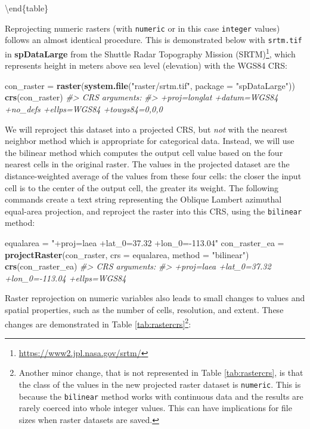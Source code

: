 \documentclass[]{krantz}
\newenvironment{Shaded}{\begin{snugshade}}{\end{snugshade}}
\newcommand{\CommentTok}[1]{\textcolor[rgb]{0.37,0.37,0.37}{\textit{#1}}}
\newcommand{\DataTypeTok}[1]{\textcolor[rgb]{0.27,0.27,0.27}{#1}}
\newcommand{\KeywordTok}[1]{\textcolor[rgb]{0.27,0.27,0.27}{\textbf{#1}}}
\newcommand{\NormalTok}[1]{#1}
\newcommand{\StringTok}[1]{\textcolor[rgb]{0.5,0.5,0.5}{#1}}
\let\rmarkdownfootnote\footnote%
\def\footnote{\protect\rmarkdownfootnote}
\renewcommand{\href}[2]{#2\footnote{\url{#1}}}
\begin{document}
\textbackslash{}end\{table\}

Reprojecting numeric rasters (with \texttt{numeric} or in this case \texttt{integer} values) follows an almost identical procedure.
This is demonstrated below with \texttt{srtm.tif} in \textbf{spDataLarge} from \href{https://www2.jpl.nasa.gov/srtm/}{the Shuttle Radar Topography Mission (SRTM)}, which represents height in meters above sea level (elevation) with the WGS84 CRS:

\begin{Shaded}
\begin{Highlighting}[]
\NormalTok{con_raster =}\StringTok{ }\KeywordTok{raster}\NormalTok{(}\KeywordTok{system.file}\NormalTok{(}\StringTok{"raster/srtm.tif"}\NormalTok{, }\DataTypeTok{package =} \StringTok{"spDataLarge"}\NormalTok{))}
\KeywordTok{crs}\NormalTok{(con_raster)}
\CommentTok{#> CRS arguments:}
\CommentTok{#>  +proj=longlat +datum=WGS84 +no_defs +ellps=WGS84 +towgs84=0,0,0}
\end{Highlighting}
\end{Shaded}

We will reproject this dataset into a projected CRS, but \emph{not} with the nearest neighbor method which is appropriate for categorical data.
Instead, we will use the bilinear method which computes the output cell value based on the four nearest cells in the original raster.
The values in the projected dataset are the distance-weighted average of the values from these four cells:
the closer the input cell is to the center of the output cell, the greater its weight.
The following commands create a text string representing the Oblique Lambert azimuthal equal-area projection, and reproject the raster into this CRS, using the \texttt{bilinear} method:

\begin{Shaded}
\begin{Highlighting}[]
\NormalTok{equalarea =}\StringTok{ "+proj=laea +lat_0=37.32 +lon_0=-113.04"}
\NormalTok{con_raster_ea =}\StringTok{ }\KeywordTok{projectRaster}\NormalTok{(con_raster, }\DataTypeTok{crs =}\NormalTok{ equalarea, }\DataTypeTok{method =} \StringTok{"bilinear"}\NormalTok{)}
\KeywordTok{crs}\NormalTok{(con_raster_ea)}
\CommentTok{#> CRS arguments:}
\CommentTok{#>  +proj=laea +lat_0=37.32 +lon_0=-113.04 +ellps=WGS84}
\end{Highlighting}
\end{Shaded}

Raster reprojection on numeric variables also leads to small changes to values and spatial properties, such as the number of cells, resolution, and extent.
These changes are demonstrated in Table \ref{tab:rastercrs}\footnote{Another minor change, that is not represented in Table \ref{tab:rastercrs}, is that the class of the values in the new projected raster dataset is \texttt{numeric}.
  This is because the \texttt{bilinear} method works with continuous data and the results are rarely coerced into whole integer values.
  This can have implications for file sizes when raster datasets are saved.}:
\end{document}
